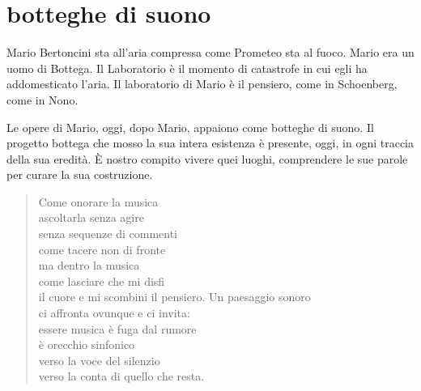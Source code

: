 %
%
%
%
%
%

\section*{botteghe di suono}


Mario Bertoncini sta all'aria compressa come Prometeo sta al fuoco. Mario era un
uomo di Bottega. Il Laboratorio è il momento di catastrofe in cui egli ha
addomesticato l'aria. Il laboratorio di Mario è il pensiero, come in Schoenberg,
come in Nono.

Le opere di Mario, oggi, dopo Mario, appaiono come botteghe di suono. Il
progetto bottega che mosso la sua intera esistenza è presente, oggi, in ogni
traccia della sua eredità. È nostro compito vivere quei luoghi, comprendere le
sue parole per curare la sua costruzione.

\begin{quote}
\verbatim
Come onorare la musica\\
ascoltarla senza agire\\
senza sequenze di commenti\\
come tacere non di fronte\\
ma dentro la musica\\
come lasciare che mi disfi\\
il cuore e mi scombini il pensiero.
Un paesaggio sonoro\\
ci affronta ovunque e ci invita:\\
essere musica è fuga dal rumore\\
è orecchio sinfonico\\
verso la voce del silenzio\\
verso la conta di quello che resta.
\end{quote}
